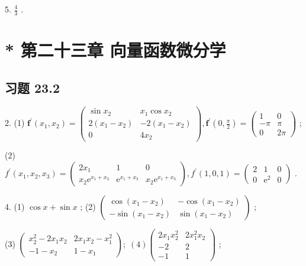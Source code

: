5. \(\frac{4}{3}\) .

\section{* 第二十三章 向量函数微分学}

\subsection{习题 23.2}

2. (1) \({\mathbf{f}}^{\prime }\left( {{x}_{1},{x}_{2}}\right)  = \left( \begin{matrix} \sin {x}_{2} & {x}_{1}\cos {x}_{2} \\  2\left( {{x}_{1} - {x}_{2}}\right) &  - 2\left( {{x}_{1} - {x}_{2}}\right) \\  0 & 4{x}_{2} \end{matrix}\right) ,{\mathbf{f}}^{\prime }\left( {0,\frac{\pi }{2}}\right)  = \left( \begin{matrix} 1 & 0 \\   - \pi & \pi \\  0 & {2\pi } \end{matrix}\right)\) ;

(2) \({f}^{\prime }\left( {{x}_{1},{x}_{2},{x}_{3}}\right)  = \left( \begin{matrix} 2{x}_{1} & 1 & 0 \\  {x}_{2}{\mathrm{e}}^{{x}_{1} + {x}_{3}} & {\mathrm{e}}^{{x}_{1} + {x}_{3}} & {x}_{2}{\mathrm{e}}^{{x}_{1} + {x}_{3}} \end{matrix}\right) ,{f}^{\prime }\left( {1,0,1}\right)  = \left( \begin{matrix} 2 & 1 & 0 \\  0 & {\mathrm{e}}^{2} & 0 \end{matrix}\right)\) .

4. (1) \(\cos x + \sin x\) ; (2) \(\left( \begin{matrix} \cos \left( {{x}_{1} - {x}_{2}}\right) &  - \cos \left( {{x}_{1} - {x}_{2}}\right) \\   - \sin \left( {{x}_{1} - {x}_{2}}\right) & \sin \left( {{x}_{1} - {x}_{2}}\right)  \end{matrix}\right)\) ;

(3) \(\left( \begin{matrix} {x}_{2}^{2} - 2{x}_{1}{x}_{2} & 2{x}_{1}{x}_{2} - {x}_{1}^{2} \\   - 1 - {x}_{2} & 1 - {x}_{1} \end{matrix}\right) ;\;\left( 4\right) \left( \begin{matrix} 2{x}_{1}{x}_{2}^{2} & 2{x}_{1}^{2}{x}_{2} \\   - 2 & 2 \\   - 1 & 1 \end{matrix}\right)\) ;

